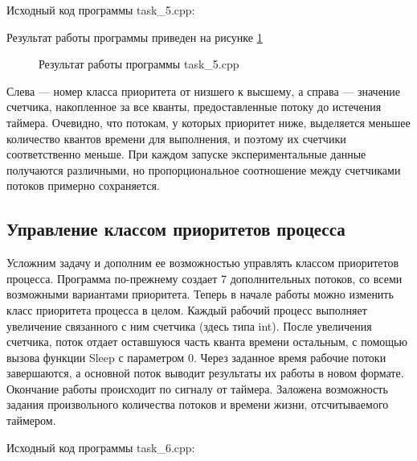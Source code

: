 \documentclass[a4paper]{article}
\begin{document}
	Исходный код программы task\_5.cpp:
	
	
	Результат работы программы приведен на рисунке \ref{img:task5}
	\begin{figure}[h!]
		\caption{Результат работы программы task\_5.cpp}
		\label{img:task5}
	\end{figure}
	
	Слева --- номер класса приоритета от низшего к высшему, а справа --- значение счетчика, накопленное за все кванты, предоставленные потоку до истечения таймера. Очевидно, что потокам, у которых приоритет ниже, выделяется меньшее количество квантов времени для выполнения, и поэтому их счетчики соответственно меньше. При каждом запуске экспериментальные данные получаются различными, но пропорциональное соотношение между счетчиками потоков примерно сохраняется.\\
	
\subsection{Управление классом приоритетов процесса}
	Усложним задачу и дополним ее возможностью управлять классом приоритетов процесса. Программа по-прежнему создает 7 дополнительных потоков, со всеми возможными вариантами приоритета. Теперь в начале работы можно изменить класс приоритета процесса в целом. Каждый рабочий процесс выполняет увеличение связанного с ним счетчика (здесь типа int). После увеличения счетчика, поток отдает оставшуюся часть кванта времени остальным, с помощью вызова функции Sleep с параметром 0. Через заданное время рабочие потоки завершаются, а основной поток выводит результаты их работы в новом формате. Окончание работы происходит по сигналу от таймера. Заложена возможность задания произвольного количества потоков и времени жизни, отсчитываемого таймером.
			
	Исходный код программы task\_6.cpp:
	
	
\end{document}
